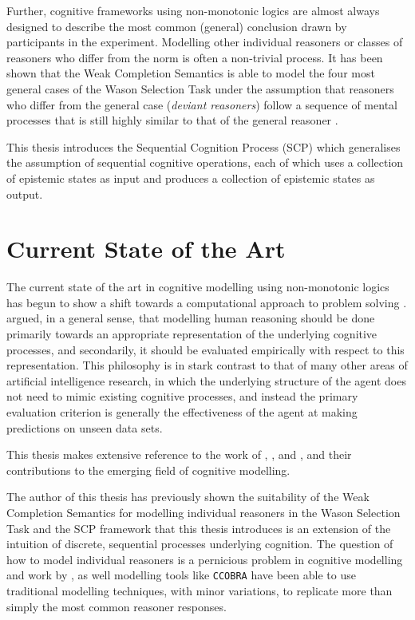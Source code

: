 Further, cognitive frameworks using non-monotonic logics are almost always designed to describe the most common (general) conclusion drawn by participants in the experiment. Modelling other individual reasoners or classes of reasoners who differ from the norm is often a non-trivial process. It has been shown that the Weak Completion Semantics \citep{holldobler2015weak} is able to model the four most general cases of the Wason Selection Task under the assumption that reasoners who differ from the general case (\textit{deviant reasoners}) follow a sequence of mental processes that is still highly similar to that of the general reasoner \citep{breu2019weak}.

This thesis introduces the Sequential Cognition Process (SCP) which generalises the assumption of sequential cognitive operations, each of which uses a collection of epistemic states as input and produces a collection of epistemic states as output. 

\section{Current State of the Art} \label{sec:soa}
The current state of the art in cognitive modelling using non-monotonic logics has begun to show a shift towards a computational approach to problem solving \citep{dietz2012computational}. \cite{stenning2012human} argued, in a general sense, that modelling human reasoning should be done primarily towards an appropriate representation of the underlying cognitive processes, and secondarily, it should be evaluated empirically with respect to this representation. This philosophy is in stark contrast to that of many other areas of artificial intelligence research, in which the underlying structure of the agent does not need to mimic existing cognitive processes, and instead the primary evaluation criterion is generally the effectiveness of the agent at making predictions on unseen data sets.

This thesis makes extensive reference to the work of \cite{dietz2012computational}, \cite{dietz2014modeling}, and \cite{ragni2017wason}, and their contributions to the emerging field of cognitive modelling. 

The author of this thesis has previously shown the suitability of the Weak Completion Semantics for modelling individual reasoners in the Wason Selection Task \citep{breu2019weak} and the SCP framework that this thesis introduces is an extension of the intuition of discrete, sequential processes underlying cognition. The question of how to model individual reasoners is a pernicious problem in cognitive modelling and work by \cite{breu2019weak}, as well modelling tools like \texttt{CCOBRA} \citep{ccobra}  have been able to use traditional modelling techniques, with minor variations, to replicate more than simply the most common reasoner responses.



